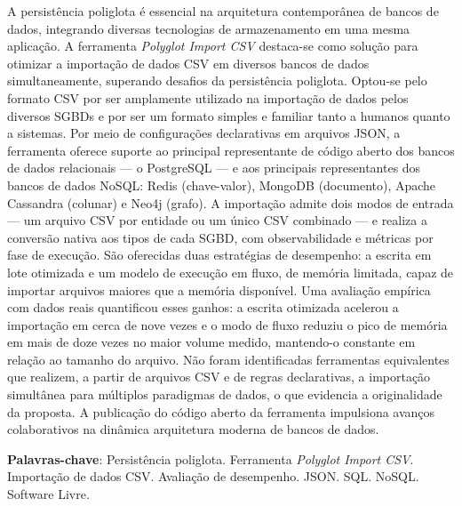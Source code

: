 \documentclass[
  12pt,
  oneside,
  a4paper,
  chapter=TITLE,
  section=TITLE,
  english,
  brazil,
]{abntex2}
\begin{document}
\begin{resumo}
  A persistência poliglota é essencial na arquitetura contemporânea de bancos de dados,
  integrando diversas tecnologias de armazenamento em uma mesma aplicação. A ferramenta
  \textit{Polyglot Import CSV} destaca-se como solução para otimizar a importação de dados
  CSV em diversos bancos de dados simultaneamente, superando desafios da persistência
  poliglota. Optou-se pelo formato CSV por ser amplamente utilizado na importação de dados
  pelos diversos SGBDs e por ser um formato simples e familiar tanto a humanos quanto a
  sistemas. Por meio de configurações declarativas em arquivos JSON, a ferramenta oferece
  suporte ao principal representante de código aberto dos bancos de dados relacionais ---
  o PostgreSQL --- e aos principais representantes dos bancos de dados NoSQL: Redis
  (chave-valor), MongoDB (documento), Apache Cassandra (colunar) e Neo4j (grafo). A
  importação admite dois modos de entrada --- um arquivo CSV por entidade ou um único CSV
  combinado --- e realiza a conversão nativa aos tipos de cada SGBD, com observabilidade e
  métricas por fase de execução. São oferecidas duas estratégias de desempenho: a escrita
  em lote otimizada e um modelo de execução em fluxo, de memória limitada, capaz de importar
  arquivos maiores que a memória disponível. Uma avaliação empírica com dados reais
  quantificou esses ganhos: a escrita otimizada acelerou a importação em cerca de nove vezes
  e o modo de fluxo reduziu o pico de memória em mais de doze vezes no maior volume medido,
  mantendo-o constante em relação ao tamanho do arquivo. Não foram identificadas ferramentas
  equivalentes que realizem, a partir de arquivos CSV e de regras declarativas, a importação
  simultânea para múltiplos paradigmas de dados, o que evidencia a originalidade da proposta.
  A publicação do código aberto da ferramenta impulsiona avanços colaborativos na dinâmica
  arquitetura moderna de bancos de dados.

  \vspace{\onelineskip}

  \noindent
  \textbf{Palavras-chave}: Persistência poliglota. Ferramenta \textit{Polyglot Import CSV}.
  Importação de dados CSV. Avaliação de desempenho. JSON. SQL. NoSQL. Software Livre.
\end{resumo}
\end{document}
